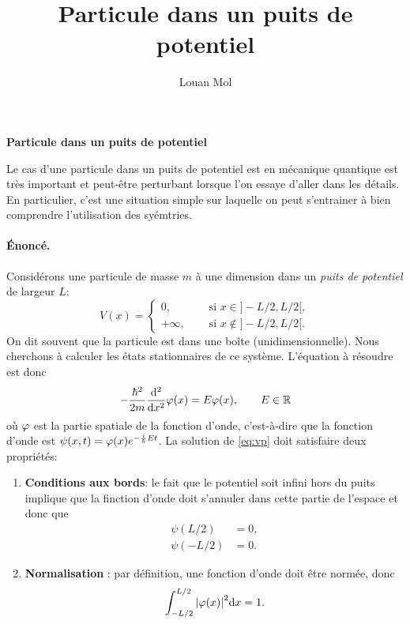 \documentclass[11pt,a4paper,oneside]{article}
\title{Particule dans un puits de potentiel}
\author{Louan Mol}
\begin{document}
\begin{center}
    {\huge \textbf{Particule dans un puits de potentiel}}
\end{center}

\vspace{1cm}

Le cas d'une particule dans un puits de potentiel est en mécanique quantique est très important et peut-être perturbant lorsque l'on essaye d'aller dans les détails. En particulier, c'est une situation simple sur laquelle on peut s'entrainer à bien comprendre l'utilisation des syémtries.

\paragraph{Énoncé.} Considérons une particule de masse $m$ à une dimension dans un \emph{puits de potentiel} de largeur $L$:
\begin{equation}
    V(x)=
    \begin{cases}
        0,\quad &\text{ si } x\in]-L/2,L/2[,\\
        +\infty,\quad &\text{ si } x\notin]-L/2,L/2[.
    \end{cases}
\end{equation}
On dit souvent que la particule est dans une boîte (unidimensionnelle). Nous cherchons à calculer les états stationnaires de ce système. L'équation à résoudre est donc
\begin{equation}
    -\frac{\hbar^2}{2m}\dv[2]{}{x}\varphi(x)=E\varphi(x),\qquad E\in\mathbb{R} \label{eq:vp}
\end{equation}
où $\varphi$ est la partie spatiale de la fonction d'onde, c'est-à-dire que la fonction d'onde est $\psi(x,t)=\varphi(x)e^{-\frac{i}{\hbar}Et}$. La solution de \eqref{eq:vp} doit satisfaire deux propriétés:
\begin{enumerate}
    \item \textbf{Conditions aux bords}: le fait que le potentiel soit infini hors du puits implique que la finction d'onde doit s'annuler dans cette partie de l'espace et donc que
    \begin{align}
        \psi(L/2) &= 0,\\
        \psi(-L/2) &= 0.
    \end{align}
    \item \textbf{Normalisation} : par définition, une fonction d'onde doit être normée, donc
    \begin{equation}
        \int_{-L/2}^{L/2}\abs{\varphi(x)}^2\text{d} x = 1.
    \end{equation}
\end{enumerate}
\end{document}

